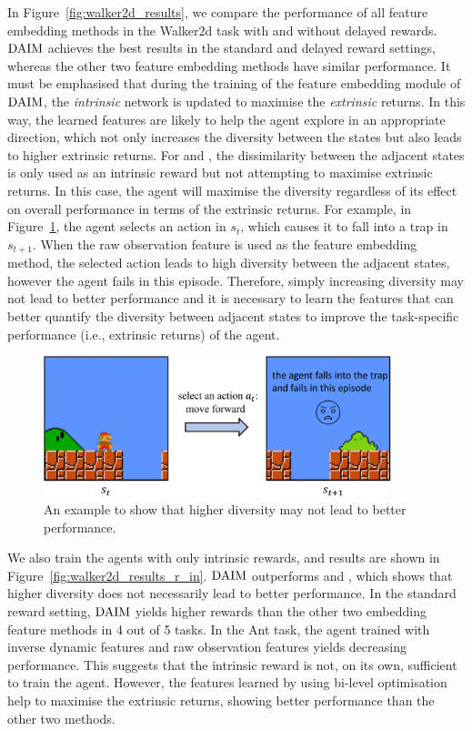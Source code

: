 In Figure~\ref{fig:walker2d_results}, we compare the performance of all feature embedding methods in the Walker2d task with and without delayed rewards. $\text{DAIM}$ achieves the best results in the standard and delayed reward settings, whereas the other two feature embedding methods have similar performance. It must be emphasised that during the training of the feature embedding module of $\text{DAIM}$, the {\em intrinsic} network is updated to maximise the {\em extrinsic} returns. In this way, the learned features are likely to help the agent explore in an appropriate direction, which not only increases the diversity between the states but also leads to higher extrinsic returns. For  and , the dissimilarity between the adjacent states is only used as an intrinsic reward but not attempting to maximise extrinsic returns. In this case, the agent will maximise the diversity regardless of its effect on overall performance in terms of the extrinsic returns. For example, in Figure~\ref{fig:why_daim}, the agent selects an action in $s_{t}$, which causes it to fall into a trap in $s_{t+1}$. When the raw observation feature is used as the feature embedding method, the selected action leads to high diversity between the adjacent states, however the agent fails in this episode. Therefore, simply increasing diversity may not lead to better performance and it is necessary to learn the features that can better quantify the diversity between adjacent states to improve the task-specific performance (i.e., extrinsic returns) of the agent.

\begin{figure}[h]
    \centering
    \includegraphics[width=0.9\textwidth]{figures/chapter5/diversity_fail.pdf}
    \caption{An example to show that higher diversity may not lead to better performance.}
    \label{fig:why_daim}
\end{figure}

We also train the agents with only intrinsic rewards, and results are shown in Figure~\ref{fig:walker2d_results_r_in}. $\text{DAIM}$ outperforms  and , which shows that higher diversity does not necessarily lead to better performance. In the standard reward setting, $\text{DAIM}$ yields higher rewards than the other two embedding feature methods in 4 out of 5 tasks. In the Ant task, the agent trained with inverse dynamic features and raw observation features yields decreasing performance. This suggests that the intrinsic reward is not, on its own, sufficient to train the agent. However, the features learned by using bi-level optimisation help to maximise the extrinsic returns, showing better performance than the other two methods.

